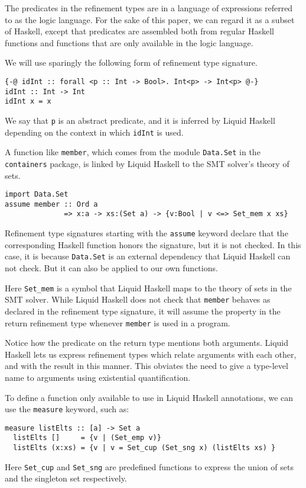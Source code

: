 \documentclass[sigconf]{acmart}
\newcommand{\tc}[1]{{\small\texttt{#1}}}
\begin{document}
The predicates in the refinement types are in a language of expressions
referred to as the logic language. For the sake of this paper, we can
regard it as a subset of Haskell, except that predicates are assembled both from
regular Haskell functions and functions that are
only available in the logic language.

We will use sparingly the following form of refinement type signature.
\begin{verbatim}
{-@ idInt :: forall <p :: Int -> Bool>. Int<p> -> Int<p> @-}
idInt :: Int -> Int
idInt x = x
\end{verbatim}
We say that \tc{p} is an abstract predicate, and it is inferred by Liquid Haskell
depending on the context in which \tc{idInt} is used.

A function like \tc{member}, which comes from the module \tc{Data.Set}
in the \tc{containers} package, is linked by Liquid Haskell to the
SMT solver's theory of sets.
\begin{verbatim}
import Data.Set
assume member :: Ord a
              => x:a -> xs:(Set a) -> {v:Bool | v <=> Set_mem x xs}
\end{verbatim}
Refinement type signatures starting with the \tc{assume} keyword declare that the
corresponding Haskell function honors the signature, but it is not
checked. In this case, it is because \tc{Data.Set} is an external dependency that
Liquid Haskell can not check. But it can also be applied to our own functions.

Here \tc{Set\_mem} is a symbol that Liquid Haskell maps to the theory
of sets in the SMT solver. While Liquid Haskell does not check that
\tc{member} behaves as declared in the refinement type signature,
it will assume the property in the return refinement type
whenever \tc{member} is used in a program.

Notice how the predicate on the return type mentions both arguments. Liquid
Haskell lets us express refinement types which relate arguments with each other,
and with the result in this manner. This obviates the need to
give a type-level name to arguments using existential quantification.

To define a function only available to use in Liquid Haskell annotations,
we can use the \tc{measure} keyword, such as:
\begin{verbatim}
measure listElts :: [a] -> Set a
  listElts []     = {v | (Set_emp v)}
  listElts (x:xs) = {v | v = Set_cup (Set_sng x) (listElts xs) }
\end{verbatim}
Here \tc{Set\_cup} and \tc{Set\_sng} are predefined functions to express the
union of sets and the singleton set respectively.
\end{document}
